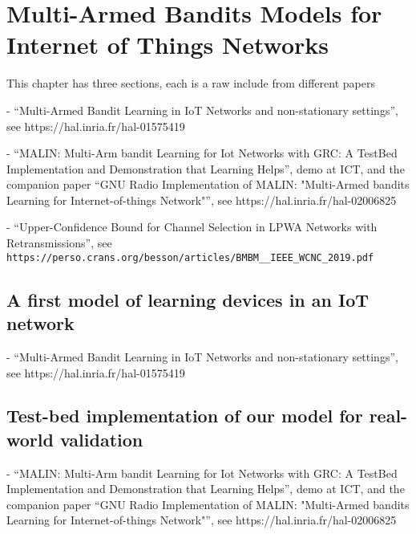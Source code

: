 
\chapter{Multi-Armed Bandits Models for Internet of Things Networks}
\label{chapter:4}
\minitoc
\newpage
\graphicspath{{2-Chapters/4-Chapter/Images/}}

This chapter has three sections, each is a raw include from different papers

- ``Multi-Armed Bandit Learning in IoT Networks and non-stationary settings'', see https://hal.inria.fr/hal-01575419

- ``MALIN: Multi-Arm bandit Learning for Iot Networks with GRC: A TestBed Implementation and Demonstration that Learning Helps'', demo at ICT, and the companion paper ``GNU Radio Implementation of MALIN: "Multi-Armed bandits Learning for Internet-of-things Network"'', see https://hal.inria.fr/hal-02006825

- ``Upper-Confidence Bound for Channel Selection in LPWA Networks with Retransmissions'', see \texttt{https://perso.crans.org/besson/articles/BMBM\_\_IEEE\_WCNC\_2019.pdf}


\section{A first model of learning devices in an IoT network}
\label{sec:4:firstModel}

- ``Multi-Armed Bandit Learning in IoT Networks and non-stationary settings'', see https://hal.inria.fr/hal-01575419




\section{Test-bed implementation of our model for real-world validation}
\label{sec:4:gnuradio}

- ``MALIN: Multi-Arm bandit Learning for Iot Networks with GRC: A TestBed Implementation and Demonstration that Learning Helps'', demo at ICT, and the companion paper ``GNU Radio Implementation of MALIN: "Multi-Armed bandits Learning for Internet-of-things Network"'', see https://hal.inria.fr/hal-02006825

